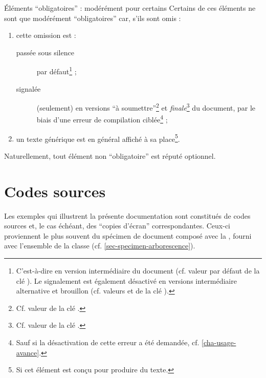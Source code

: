 \begin{dbremark}{Éléments \enquote{obligatoires} : modérément pour certains}{}
  Certains de ces éléments ne sont que modérément \enquote{obligatoires} car,
  s'ils sont omis :
  \begin{enumerate}
  \item cette omission est :
    \begin{description}
    \item[passée sous silence] par défaut\footnote{C'est-à-dire en version
        intermédiaire du document (cf. valeur par défaut 
        de la clé ). Le signalement est également désactivé en
        versions intermédiaire alternative et brouillon (cf. valeurs
         et  de la clé
        ).} ;
    \item[signalée] (seulement) en versions \enquote{à
        soumettre}\footnote{Cf. valeur  de la clé
        .} et \emph{finale}\footnote{Cf. valeur 
        de la clé .} du document, par le biais d'une erreur de
      compilation
      ciblée\footnote{Sauf si la désactivation de cette erreur a été demandée,
        cf. %
        \vref{cha-usage-avance}.} ;
    \end{description}
  \item un texte générique est en général affiché à sa place\footnote{Si cet
      élément est conçu pour produire du texte.}.
  \end{enumerate}
\end{dbremark}

Naturellement, tout élément non \enquote{obligatoire} est réputé optionnel.

\section{Codes sources}
\label{sec-codes-sources}
%

Les exemples qui illustrent la présente documentation sont constitués de codes
sources et, le cas échéant, des \enquote{copies d'écran} correspondantes.
Ceux-ci proviennent le plus souvent du spécimen de document composé avec la
\yatCl, fourni avec l'ensemble de la classe
(cf. \vref{sec-specimen-arborescence}).

